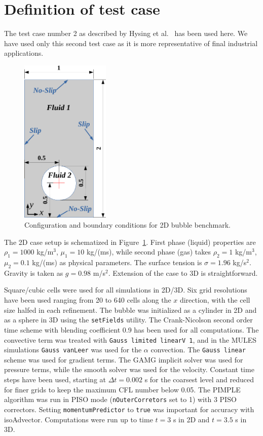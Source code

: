 \documentclass[review]{elsarticle}
\begin{document}
\section{Definition of test case}\label{sec_testcasedef}
The test case number 2 as described by Hysing et al.~\cite{Hysing2009} has been used here. 
We have used only this second test case as it is more representative of final industrial
applications. 
\begin{figure}[!h]
\begin{center}
 \vspace{-1mm}
 \includegraphics[width=4.25cm]{figures/benchmark_scheme.pdf}
 \vspace{-7mm}
\end{center}
\caption{Configuration and boundary conditions for 2D bubble benchmark.}
\label{fig:1}
\end{figure}
The 2D case setup is schematized in Figure~\ref{fig:1}. First phase (liquid) properties are 
$\rho_1=1000$ kg/m$^3$, $\mu_1=10$ kg/(ms), while second phase (gas) takes $\rho_2=1$ kg/m$^3$, $\mu_2=0.1$ kg/(ms) as physical parameters. 
The surface tension is $\sigma=1.96$ kg/s$^2$. Gravity is taken as $g=0.98$ m/s$^2$. Extension of the case to 3D is straightforward.

Square/cubic cells were used for all simulations in 2D/3D. Six grid resolutions have been used ranging from 20 to 640 cells along the $x$ direction, with the cell size halfed in each refinement. The bubble was initialized as a cylinder in 2D and as a sphere in 3D using the \verb+setFields+ utility. The Crank-Nicolson second order time scheme with blending coefficient 0.9 has been used for all computations. The convective term was treated with \verb+Gauss limited linearV 1+, and in the MULES simulations \verb+Gauss vanLeer+ was used for the $\alpha$ convection. The \verb+Gauss linear+ scheme was used for gradient terms. The GAMG implicit solver was used for pressure terms, while the smooth solver was used for the velocity. Constant time steps have been used, starting at $\Delta t=0.002$ s for the coarsest level and reduced for finer grids to keep the maximum CFL number below 0.05. The PIMPLE algorithm was run in PISO mode (\verb+nOuterCorretors+ set to 1) with 3 PISO correctors. Setting \verb+momentumPredictor+ to \verb+true+ was important for accuracy with isoAdvector. Computations were run up to time $t=3$ s in 2D and $t=3.5$ s in 3D. 
\end{document}
